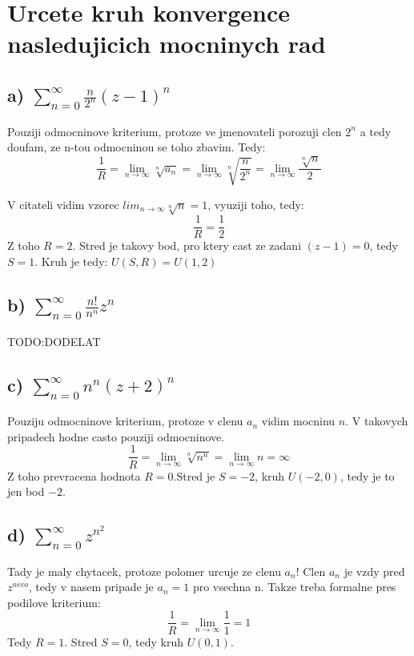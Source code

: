 \section{Urcete kruh konvergence nasledujicich mocninych rad}

\subsection{a) $\sum_{n=0}^{\infty} \frac{n}{2^n}(z-1)^n$}
Pouziji odmocninove kriterium, protoze ve jmenovateli porozuji clen $2^n$ a tedy doufam, ze n-tou odmocninou se toho zbavim. Tedy:
$$\frac{1}{R} = \lim_{n \to \infty} \sqrt[n]{a_n} = \lim_{n \to \infty} \sqrt[n]{\frac{n}{2^n}}=\lim_{n \to \infty} \frac{\sqrt[n]{n}}{2}$$

V citateli vidim vzorec $lim_{n \to \infty} \sqrt[n]{n} =1$, vyuziji toho, tedy:
$$\frac{1}{R} = \frac{1}{2}$$
Z toho $R=2$. Stred je takovy bod, pro ktery cast ze zadani $(z-1) =0$, tedy $S=1$. Kruh je tedy:
$U(S,R) = U(1,2)$

\subsection{b) $\sum_{n=0}^\infty \frac{n!}{n^n}z^n$}

TODO:DODELAT

\subsection{c) $\sum_{n=0}^\infty n^n (z+2)^n$ }
Pouziju odmocninove kriterium, protoze v clenu $a_n$ vidim mocninu $n$. V takovych pripadech hodne casto pouziji odmocninove.
$$\frac{1}{R} = \lim_{n \to \infty} \sqrt[n]{n^n} = \lim_{n \to \infty} n = \infty$$
Z toho prevracena hodnota $R=0$.Stred je $S=-2$, kruh $U(-2,0)$, tedy je to jen bod ${-2}$.

\subsection{d) $\sum_{n=0}^\infty z^{n^2}$}
Tady je maly chytacek, protoze polomer urcuje ze clenu $a_n$! Clen $a_n$ je vzdy pred $z^{neco}$, tedy v nasem pripade je $a_n = 1$ pro vsechna n. Takze treba formalne pres podilove kriterium:
$$\frac{1}{R} = \lim_{n \to \infty} \frac{1}{1} = 1$$
Tedy $R=1$. Stred $S=0$, tedy kruh $U(0,1)$.

